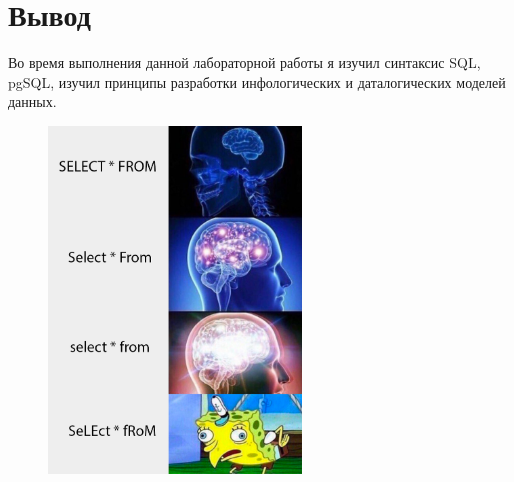 \section{Вывод}
Во время выполнения данной лабораторной работы я изучил синтаксис SQL, pgSQL,
изучил принципы разработки инфологических и даталогических моделей данных.

\begin{figure}[ht]
    \centering
    \includegraphics[width=0.6\textwidth]{img/meme.png}
\end{figure}